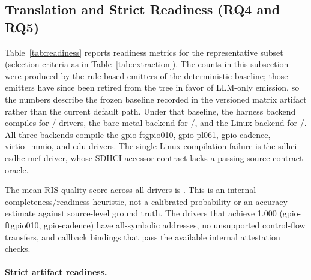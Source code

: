 \subsection{Translation and Strict Readiness (RQ4 and RQ5)}

Table~\ref{tab:readiness} reports readiness metrics for the representative
subset (selection criteria as in Table~\ref{tab:extraction}). The counts in
this subsection were produced by the rule-based emitters of the deterministic
baseline; those emitters have since been retired from the tree in favor of
LLM-only emission, so the numbers describe the frozen baseline recorded in
the versioned matrix artifact rather than the current default path. Under
that baseline, the harness backend
compiles for \HarnessCompileCount{}/\EvalDrivers{} drivers, the bare-metal
backend for \BaremetalCompileCount{}/\EvalDrivers{}, and the Linux backend
for \LinuxCompileCount{}/\EvalDrivers{}. All three backends compile the
gpio-ftgpio010, gpio-pl061, gpio-cadence, virtio\_mmio, and edu drivers. The
single Linux compilation failure is the sdhci-esdhc-mcf driver, whose SDHCI
accessor contract lacks a passing source-contract oracle.

\begin{table}[t]
\centering
\caption{Readiness results. RIS = internal RIS quality heuristic (0--1),
FuncSpec = function-spec quality, DevSpec = device-spec quality. H/B/L =
harness / bare-metal / Linux compilation. Linux ready denotes strict artifact
readiness; synthesis-eligible denotes sufficient context to attempt LLM
synthesis. ``--'' means the check does not apply to that driver/backend
(e.g., strict Linux readiness without a kernel-side lifecycle model);
$\times$ means the check applied and failed; no ``--'' entry masks a
failing check.}
\label{tab:readiness}
\resizebox{\columnwidth}{!}{\ReadinessResultsTable}
\end{table}

The mean RIS quality score across all drivers is \EvalMeanRIS{}. This is an
internal completeness/readiness heuristic, not a calibrated probability or an
accuracy estimate against source-level ground truth. The drivers that achieve
1.000 (gpio-ftgpio010, gpio-cadence) have all-symbolic addresses, no
unsupported control-flow transfers, and callback bindings that pass the available internal attestation checks.

\paragraph{Strict artifact readiness.}

